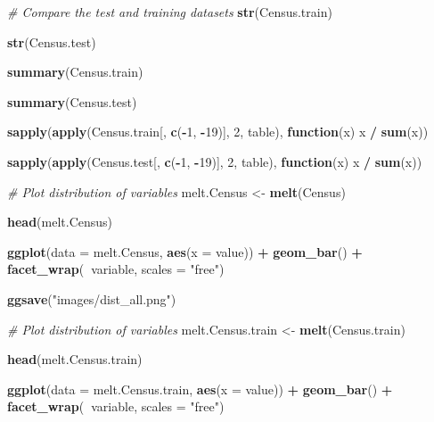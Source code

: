 \documentclass[]{book}
\newenvironment{Shaded}{\begin{snugshade}}{\end{snugshade}}
\newcommand{\KeywordTok}[1]{\textcolor[rgb]{0.13,0.29,0.53}{\textbf{#1}}}
\newcommand{\DataTypeTok}[1]{\textcolor[rgb]{0.13,0.29,0.53}{#1}}
\newcommand{\DecValTok}[1]{\textcolor[rgb]{0.00,0.00,0.81}{#1}}
\newcommand{\StringTok}[1]{\textcolor[rgb]{0.31,0.60,0.02}{#1}}
\newcommand{\CommentTok}[1]{\textcolor[rgb]{0.56,0.35,0.01}{\textit{#1}}}
\newcommand{\ControlFlowTok}[1]{\textcolor[rgb]{0.13,0.29,0.53}{\textbf{#1}}}
\newcommand{\OperatorTok}[1]{\textcolor[rgb]{0.81,0.36,0.00}{\textbf{#1}}}
\newcommand{\NormalTok}[1]{#1}
\begin{document}
\begin{Shaded}
\begin{Highlighting}[]
\CommentTok{# Compare the test and training datasets}
\KeywordTok{str}\NormalTok{(Census.train)}

\KeywordTok{str}\NormalTok{(Census.test)}

\KeywordTok{summary}\NormalTok{(Census.train)}

\KeywordTok{summary}\NormalTok{(Census.test)}

\KeywordTok{sapply}\NormalTok{(}\KeywordTok{apply}\NormalTok{(Census.train[, }\KeywordTok{c}\NormalTok{(}\OperatorTok{-}\DecValTok{1}\NormalTok{, }\OperatorTok{-}\DecValTok{19}\NormalTok{)], }\DecValTok{2}\NormalTok{, table), }\ControlFlowTok{function}\NormalTok{(x) x }\OperatorTok{/}\StringTok{ }\KeywordTok{sum}\NormalTok{(x))}

\KeywordTok{sapply}\NormalTok{(}\KeywordTok{apply}\NormalTok{(Census.test[, }\KeywordTok{c}\NormalTok{(}\OperatorTok{-}\DecValTok{1}\NormalTok{, }\OperatorTok{-}\DecValTok{19}\NormalTok{)], }\DecValTok{2}\NormalTok{, table), }\ControlFlowTok{function}\NormalTok{(x) x }\OperatorTok{/}\StringTok{ }\KeywordTok{sum}\NormalTok{(x))}

\CommentTok{# Plot distribution of variables}
\NormalTok{melt.Census <-}\StringTok{ }\KeywordTok{melt}\NormalTok{(Census)}

\KeywordTok{head}\NormalTok{(melt.Census)}

\KeywordTok{ggplot}\NormalTok{(}\DataTypeTok{data =}\NormalTok{ melt.Census, }\KeywordTok{aes}\NormalTok{(}\DataTypeTok{x =}\NormalTok{ value)) }\OperatorTok{+}
\StringTok{  }\KeywordTok{geom_bar}\NormalTok{() }\OperatorTok{+}
\StringTok{  }\KeywordTok{facet_wrap}\NormalTok{(}\OperatorTok{~}\NormalTok{variable, }\DataTypeTok{scales =} \StringTok{"free"}\NormalTok{)}

\KeywordTok{ggsave}\NormalTok{(}\StringTok{"images/dist_all.png"}\NormalTok{)}

\CommentTok{# Plot distribution of variables}
\NormalTok{melt.Census.train <-}\StringTok{ }\KeywordTok{melt}\NormalTok{(Census.train)}

\KeywordTok{head}\NormalTok{(melt.Census.train)}

\KeywordTok{ggplot}\NormalTok{(}\DataTypeTok{data =}\NormalTok{ melt.Census.train, }\KeywordTok{aes}\NormalTok{(}\DataTypeTok{x =}\NormalTok{ value)) }\OperatorTok{+}
\StringTok{  }\KeywordTok{geom_bar}\NormalTok{() }\OperatorTok{+}
\StringTok{  }\KeywordTok{facet_wrap}\NormalTok{(}\OperatorTok{~}\NormalTok{variable, }\DataTypeTok{scales =} \StringTok{"free"}\NormalTok{)}


\end{Highlighting}
\end{Shaded}
\end{document}
